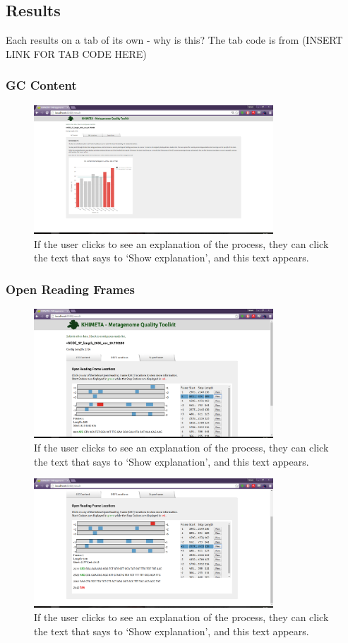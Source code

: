 \subsection{Results}
Each results on a tab of its own - why is this? The tab code is from (INSERT LINK FOR TAB CODE HERE)
\subsubsection{GC Content}
\begin{figure}[H]
	\centering
\includegraphics[width=0.8\textwidth]{images/ui5}
\caption{If the user clicks to see an explanation of the process, they can click the text that says to `Show explanation', and this text appears.}
\end{figure}
\subsubsection{Open Reading Frames}
\begin{figure}[H]
	\centering
\includegraphics[width=0.8\textwidth]{images/ui6}
\caption{If the user clicks to see an explanation of the process, they can click the text that says to `Show explanation', and this text appears.}
\end{figure}
\begin{figure}[H]
	\centering
\includegraphics[width=0.8\textwidth]{images/ui7}
\caption{If the user clicks to see an explanation of the process, they can click the text that says to `Show explanation', and this text appears.}
\end{figure}
